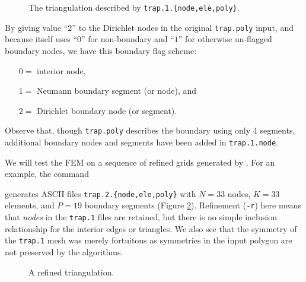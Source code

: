 \begin{figure}

\caption{The triangulation described by \texttt{trap.1.\{node,ele,poly\}}.}
\label{fig:un:trapone}
\end{figure}


By giving value ``$2$'' to the Dirichlet nodes in the original \texttt{trap.poly} input, and because \Triangle itself uses ``$0$'' for non-boundary and ``$1$'' for otherwise un-flagged boundary nodes, we have this boundary flag scheme:
\begin{itemize}
\item[$0=$] interior node,
\item[$1=$] Neumann boundary segment (or node), and
\item[$2=$] Dirichlet boundary node (or segment).
\end{itemize}
Observe that, though \texttt{trap.poly} describes the boundary using only 4 segments, additional boundary nodes and segments have been added in \texttt{trap.1.node}.


We will test the FEM on a sequence of refined grids generated by \Triangle.  For an example, the command
generates ASCII files \texttt{trap.2.\{node,ele,poly\}} with $N=33$ nodes, $K=33$ elements, and $P=19$ boundary segments (Figure \ref{fig:un:traptwo}).  Refinement (\texttt{-r}) here means that \emph{nodes} in the \texttt{trap.1} files are retained, but there is no simple inclusion relationship for the interior edges or triangles.  We also see that the symmetry of the \texttt{trap.1} mesh was merely fortuitous as symmetries in the input polygon are not preserved by the \Triangle algorithms.


\begin{figure}

\caption{A refined triangulation.}
\label{fig:un:traptwo}
\end{figure}

